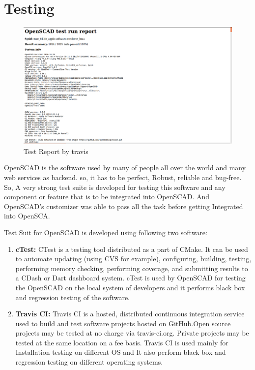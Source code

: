 \section{Testing}

\begin{figure}
    \centering
    \includegraphics[width=\linewidth]{images/travisTestReport}
    \caption{Test Report by travis}
    \label{fig:travisTestReport}
\end{figure}

OpenSCAD is the software used by many of people all over the world and many web services as backend. so, it has to be perfect, Robust, reliable and bug-free. So, A very strong test suite is developed for testing this software and any component or feature that is to be integrated into OpenSCAD. And OpenSCAD's customizer was able to pass all the task before getting Integrated into OpenSCA.

Test Suit for OpenSCAD is developed using following two software:

\begin{enumerate}
    \item \textbf{cTest:} CTest is a testing tool distributed as a part of CMake. It can be used to automate updating (using CVS for example), configuring, building, testing, performing memory checking, performing coverage, and submitting results to a CDash or Dart dashboard system.
    cTest is used by OpenSCAD for testing the OpenSCAD on the local system of developers and it performs black box and regression testing of the software.
   
    \item \textbf{Travis CI:} Travis CI is a hosted, distributed continuous integration service used to build and test software projects hosted on GitHub.Open source projects may be tested at no charge via travis-ci.org. Private projects may be tested at the same location on a fee basis.
    Travis CI is used mainly for Installation testing on different OS and It also perform  black box and regression testing on different operating systems.
   
\end{enumerate}

